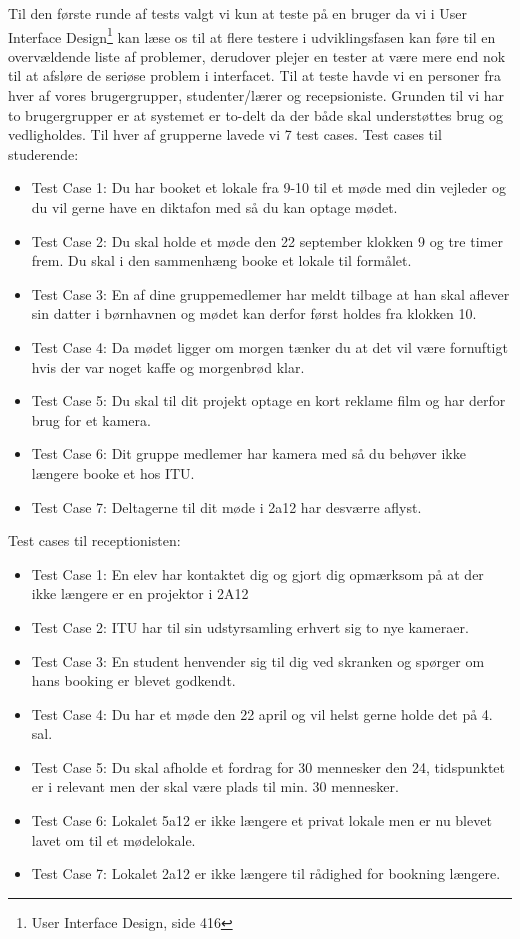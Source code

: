  Til den første runde af tests valgt vi kun at teste på en bruger da vi i User Interface Design\footnote{User Interface Design, side 416} kan læse os til at flere testere i udviklingsfasen kan føre til en overvældende liste af problemer, derudover plejer en tester at være mere end nok til at afsløre de seriøse problem i interfacet.
Til at teste havde vi en personer fra hver af vores brugergrupper, studenter/lærer og recepsioniste. Grunden til vi har to brugergrupper er at systemet er to-delt da der både skal understøttes brug og vedligholdes. Til hver af grupperne lavede vi 7 test cases.
Test cases til studerende:
\begin{itemize}
\item Test Case 1: Du har booket et lokale fra 9-10 til et møde med din vejleder og du vil gerne have en diktafon med så du kan optage mødet.
\item Test Case 2: Du skal holde et møde den 22 september klokken 9 og tre timer frem. Du skal i den sammenhæng booke et lokale til formålet.
\item Test Case 3: En af dine gruppemedlemer har meldt tilbage at han skal aflever sin datter i børnhavnen og mødet kan derfor først holdes fra klokken 10.
\item Test Case 4: Da mødet ligger om morgen tænker du at det vil være fornuftigt hvis der var noget kaffe og morgenbrød klar.
\item Test Case 5: Du skal til dit projekt optage en kort reklame film og har derfor brug for et kamera.
\item Test Case 6: Dit gruppe medlemer har kamera med så du behøver ikke længere booke et hos ITU.
\item Test Case 7: Deltagerne til dit møde i 2a12 har desværre aflyst.
\end{itemize}
Test cases til receptionisten:
\begin{itemize}
\item Test Case 1: En elev har kontaktet dig og gjort dig opmærksom på at der ikke længere er en projektor i 2A12
\item Test Case 2: ITU har til sin udstyrsamling erhvert sig to nye kameraer.
\item Test Case 3: En student henvender sig til dig ved skranken og spørger om hans booking er blevet godkendt.
\item Test Case 4: Du har et møde den 22 april og vil helst gerne holde det på 4. sal.
\item Test Case 5: Du skal afholde et fordrag for 30 mennesker den 24, tidspunktet er i relevant men der skal være plads til min. 30 mennesker.
\item Test Case 6: Lokalet 5a12 er ikke længere et privat lokale men er nu blevet lavet om til et mødelokale.
\item Test Case 7: Lokalet 2a12 er ikke længere til rådighed for bookning længere.
\end{itemize}
